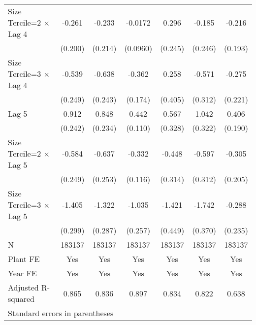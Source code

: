 \begin{table}[htbp]
\begin{tabular}{l*{6}{c}}
\addlinespace
Size Tercile=2 $\times$ Lag 4&   -0.261         &   -0.233         &  -0.0172         &    0.296         &   -0.185         &   -0.216         \\
                &  (0.200)         &  (0.214)         & (0.0960)         &  (0.245)         &  (0.246)         &  (0.193)         \\
\addlinespace
Size Tercile=3 $\times$ Lag 4&   -0.539\sym{*}  &   -0.638\sym{**} &   -0.362\sym{*}  &    0.258         &   -0.571         &   -0.275         \\
                &  (0.249)         &  (0.243)         &  (0.174)         &  (0.405)         &  (0.312)         &  (0.221)         \\
\addlinespace
Lag 5           &    0.912\sym{***}&    0.848\sym{***}&    0.442\sym{***}&    0.567         &    1.042\sym{**} &    0.406\sym{*}  \\
                &  (0.242)         &  (0.234)         &  (0.110)         &  (0.328)         &  (0.322)         &  (0.190)         \\
\addlinespace
Size Tercile=2 $\times$ Lag 5&   -0.584\sym{*}  &   -0.637\sym{*}  &   -0.332\sym{**} &   -0.448         &   -0.597         &   -0.305         \\
                &  (0.249)         &  (0.253)         &  (0.116)         &  (0.314)         &  (0.312)         &  (0.205)         \\
\addlinespace
Size Tercile=3 $\times$ Lag 5&   -1.405\sym{***}&   -1.322\sym{***}&   -1.035\sym{***}&   -1.421\sym{**} &   -1.742\sym{***}&   -0.288         \\
                &  (0.299)         &  (0.287)         &  (0.257)         &  (0.449)         &  (0.370)         &  (0.235)         \\
\midrule
N               &   183137         &   183137         &   183137         &   183137         &   183137         &   183137         \\
Plant FE        &      Yes         &      Yes         &      Yes         &      Yes         &      Yes         &      Yes         \\
Year FE         &      Yes         &      Yes         &      Yes         &      Yes         &      Yes         &      Yes         \\
Adjusted R-squared&    0.865         &    0.836         &    0.897         &    0.834         &    0.822         &    0.638         \\
\bottomrule
\multicolumn{7}{l}{\footnotesize Standard errors in parentheses}\\

\end{tabular}
\end{table}
